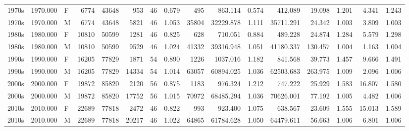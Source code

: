 \begin{table}
\begin{tabular}{lrlrrrrrrrrrrrrr}
      1970s &  1970.000 &         F &  6774 &  43648 &          953 &      46 &                 0.679 &        495 &          863.114 &              0.574 &       412.089 &    19.098 &           1.201 &    4.341 &                    1.243 \\
      1970s &  1970.000 &         M &  6774 &  43648 &         5821 &      46 &                 1.053 &      35804 &        32229.878 &              1.111 &     35711.291 &    24.342 &           1.003 &    3.809 &                    1.003 \\
      1980s &  1980.000 &         F & 10810 &  50599 &         1281 &      46 &                 0.825 &        628 &          710.051 &              0.884 &       489.228 &    24.874 &           1.284 &    5.579 &                    1.298 \\
      1980s &  1980.000 &         M & 10810 &  50599 &         9529 &      46 &                 1.024 &      41332 &        39316.948 &              1.051 &     41180.337 &   130.457 &           1.004 &    1.163 &                    1.004 \\
      1990s &  1990.000 &         F & 16205 &  77829 &         1871 &      54 &                 0.890 &       1226 &         1037.016 &              1.182 &       841.568 &    39.773 &           1.457 &    9.666 &                    1.491 \\
      1990s &  1990.000 &         M & 16205 &  77829 &        14334 &      54 &                 1.014 &      63057 &        60894.025 &              1.036 &     62503.683 &   263.975 &           1.009 &    2.096 &                    1.006 \\
      2000s &  2000.000 &         F & 19872 &  85820 &         2120 &      56 &                 0.875 &       1183 &          976.324 &              1.212 &       747.222 &    25.929 &           1.583 &   16.807 &                    1.580 \\
      2000s &  2000.000 &         M & 19872 &  85820 &        17752 &      56 &                 1.015 &      70972 &        68485.294 &              1.036 &     70626.001 &    77.192 &           1.005 &    4.482 &                    1.006 \\
      2010s &  2010.000 &         F & 22689 &  77818 &         2472 &      46 &                 0.822 &        993 &          923.400 &              1.075 &       638.567 &    23.609 &           1.555 &   15.013 &                    1.589 \\
      2010s &  2010.000 &         M & 22689 &  77818 &        20217 &      46 &                 1.022 &      64865 &        61784.628 &              1.050 &     64479.611 &    56.663 &           1.006 &    6.801 &                    1.006 \\

\end{tabular}
\end{table}
